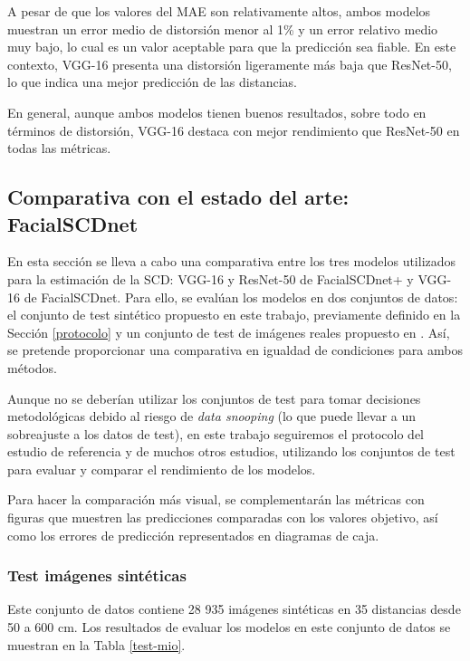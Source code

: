 A pesar de que los valores del MAE son relativamente altos, ambos modelos muestran un error medio de distorsión menor al 1\% y un error relativo medio muy bajo, lo cual es un valor aceptable para que la predicción sea fiable. En este contexto, VGG-16 presenta una distorsión ligeramente más baja que ResNet-50, lo que indica una mejor predicción de las distancias.

En general, aunque ambos modelos tienen buenos resultados, sobre todo en términos de distorsión, VGG-16 destaca con mejor rendimiento que ResNet-50 en todas las métricas.

\subsection{Comparativa con el estado del arte: FacialSCDnet}

En esta sección se lleva a cabo una comparativa entre los tres modelos utilizados para la estimación de la SCD: VGG-16 y ResNet-50 de FacialSCDnet+ y VGG-16 de FacialSCDnet. Para ello, se evalúan los modelos en dos conjuntos de datos: el conjunto de test sintético propuesto en este trabajo, previamente definido en la Sección \ref{protocolo} y un conjunto de test de imágenes reales propuesto en \cite{14}. Así, se pretende proporcionar una comparativa en igualdad de condiciones para ambos métodos. 

Aunque no se deberían utilizar los conjuntos de test para tomar decisiones metodológicas debido al riesgo de \textit{data snooping} (lo que puede llevar a un sobreajuste a los datos de test), en este trabajo seguiremos el protocolo del estudio de referencia \cite{14} y de muchos otros estudios, utilizando los conjuntos de test para evaluar y comparar el rendimiento de los modelos.

Para hacer la comparación más visual, se complementarán las métricas con figuras que muestren las predicciones comparadas con los valores objetivo, así como los errores de predicción representados en diagramas de caja.

\subsubsection{Test imágenes sintéticas}

Este conjunto de datos contiene 28 935 imágenes sintéticas en 35 distancias desde 50 a 600 cm. Los resultados de evaluar los modelos en este conjunto de datos se muestran en la Tabla \ref{test-mio}.

